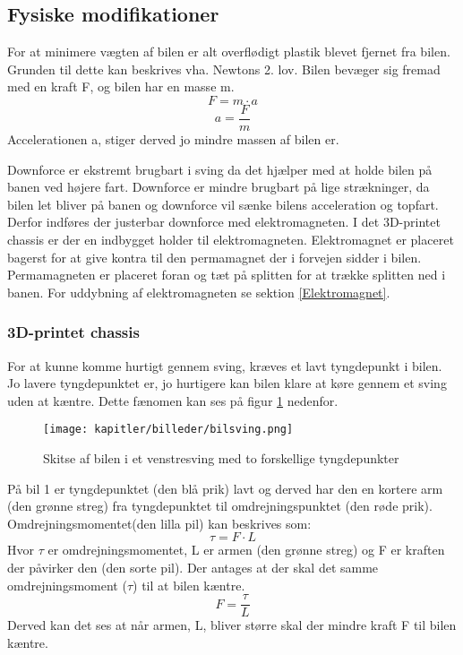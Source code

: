 \subsection{Fysiske modifikationer}
\label{fysiske-modifik}

For at minimere vægten af bilen er alt overflødigt plastik blevet fjernet fra bilen.
Grunden til dette kan beskrives vha. Newtons 2. lov. Bilen bevæger sig fremad med en kraft F, og bilen har en masse m.
\begin{equation}
F=m \cdot a
\end{equation}
\begin{equation}
a = \frac{F}{m}
\end{equation}
Accelerationen a, stiger derved jo mindre massen af bilen er.

Downforce er ekstremt brugbart i sving da det hjælper med at holde bilen på banen ved højere fart. Downforce er mindre brugbart på lige strækninger, da bilen let bliver på banen og downforce vil sænke bilens acceleration og topfart. Derfor indføres der justerbar downforce med elektromagneten. I det 3D-printet chassis er der en indbygget holder til elektromagneten. Elektromagnet er placeret bagerst for at give kontra til den permamagnet der i forvejen sidder i bilen. Permamagneten er placeret foran og tæt på splitten for at trække splitten ned i banen. For uddybning af elektromagneten se sektion \ref{Elektromagnet}.

\subsubsection{3D-printet chassis}

For at kunne komme hurtigt gennem sving, kræves et lavt tyngdepunkt i bilen.
Jo lavere tyngdepunktet er, jo hurtigere kan bilen klare at køre gennem et sving uden at kæntre.
Dette fænomen kan ses på figur \ref{fig:bilsving} nedenfor.
\begin{figure}[ht]
    \centering
    \texttt{[image: kapitler/billeder/bilsving.png]}
    \caption{Skitse af bilen i et venstresving med to forskellige tyngdepunkter}
    \label{fig:bilsving}
\end{figure}
På bil 1 er tyngdepunktet (den blå prik) lavt og derved har den en kortere arm (den grønne streg) fra tyngdepunktet til omdrejningspunktet (den røde prik). Omdrejningsmomentet(den lilla pil) kan beskrives som:
\begin{equation}
\tau = F \cdot L
\end{equation}
Hvor $\tau$ er omdrejningsmomentet, L er armen (den grønne streg) og F er kraften der påvirker den (den sorte pil). Der antages at der skal det samme omdrejningsmoment ($\tau$) til at bilen kæntre.
\begin{equation}
F = \frac{\tau}{L}
\end{equation}
Derved kan det ses at når armen, L, bliver større skal der mindre kraft F til bilen kæntre.

